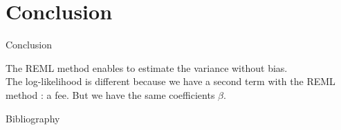 \documentclass[unknownkeysallowed]{beamer}
\begin{document}
\section{Conclusion}
\label{sec:conclusion}


\begin{frame}{Conclusion}

The REML method enables to estimate the variance without bias.\\
\vspace{0.5cm}
The log-likelihood is different because we have a second term with the REML method : a fee. But we have the same coefficients $\beta$.
\end{frame}

\begin{frame}{Bibliography}
\nocite{*}
\printbibliography
\end{frame}
\end{document}
